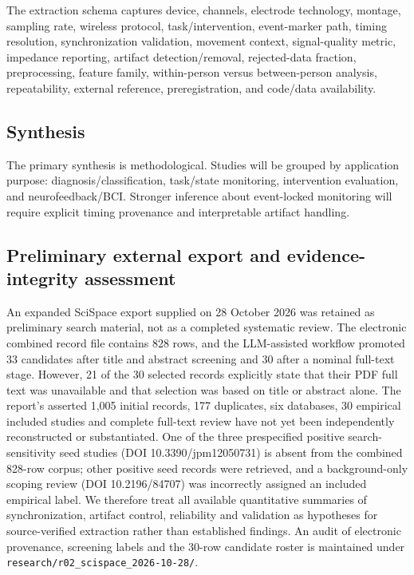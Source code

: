 The extraction schema captures device, channels, electrode technology, montage, sampling rate, wireless protocol, task/intervention, event-marker path, timing resolution, synchronization validation, movement context, signal-quality metric, impedance reporting, artifact detection/removal, rejected-data fraction, preprocessing, feature family, within-person versus between-person analysis, repeatability, external reference, preregistration, and code/data availability.

\subsection{Synthesis}

The primary synthesis is methodological. Studies will be grouped by application purpose: diagnosis/classification, task/state monitoring, intervention evaluation, and neurofeedback/BCI. Stronger inference about event-locked monitoring will require explicit timing provenance and interpretable artifact handling.


\subsection{Preliminary external export and evidence-integrity assessment}

An expanded SciSpace export supplied on 28 October 2026 was retained as preliminary search material, not as a completed systematic review. The electronic combined record file contains 828 rows, and the LLM-assisted workflow promoted 33 candidates after title and abstract screening and 30 after a nominal full-text stage. However, 21 of the 30 selected records explicitly state that their PDF full text was unavailable and that selection was based on title or abstract alone. The report's asserted 1,005 initial records, 177 duplicates, six databases, 30 empirical included studies and complete full-text review have not yet been independently reconstructed or substantiated. One of the three prespecified positive search-sensitivity seed studies (DOI 10.3390/jpm12050731) is absent from the combined 828-row corpus; other positive seed records were retrieved, and a background-only scoping review (DOI 10.2196/84707) was incorrectly assigned an included empirical label. We therefore treat all available quantitative summaries of synchronization, artifact control, reliability and validation as hypotheses for source-verified extraction rather than established findings. An audit of electronic provenance, screening labels and the 30-row candidate roster is maintained under \texttt{research/r02\_scispace\_2026-10-28/}.

